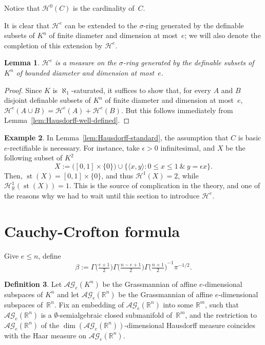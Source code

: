 \documentclass[a4paper, 12pt, final]{article}
\newtheorem{lem}{Lemma}[section]
\newtheorem{open problem}[lem]{Open problem}
\theoremstyle{remark}
\theoremstyle{definition}
\newtheorem{dfn}[lem]{Definition}
\newtheorem{final remark}[lem]{Final remark}
\newtheorem{example}[lem]{Example}
\begin{document}
Notice that ${\mathcal H}^0(C)$ is the cardinality of~$C$.

It is clear that ${\mathcal H}^e$ can be extended to the $\sigma$-ring generated by
the definable subsets of ${K}^n$ of finite diameter and dimension at most~$e$;
we will also denote  the completion of this  extension by ${\mathcal H}^e$.

\begin{lem}
${\mathcal H}^e$ is a measure on the $\sigma$-ring generated by
the definable subsets of ${K}^n$ of bounded diameter and dimension at most~$e$.
\end{lem}

\begin{proof}
Since ${K}$ is $\aleph_1$-saturated, it suffices to show that, for every
$A$ and $B$ disjoint definable subsets of ${K}^n$ of finite diameter and
dimension at most~$e$, ${{\mathcal H}^{e}}(A \cup B) = {{\mathcal H}^{e}}(A) + {{\mathcal H}^{e}}(B)$.
But this follows immediately from Lemma~\ref{lem:Hausdorff-well-defined}.
\end{proof}

\begin{example}\label{ex:double}
In Lemma~\ref{lem:Hausdorff-standard}, the assumption that $C$ is {basic $e$-rectifiable\xspace} is
necessary.
For instance, take $\epsilon > 0$ infinitesimal, and $X$ be the following
subset of ${K}^2$
\[
X := {\bigl( {[0,1] \times {\{0\}}} \bigr)} \cup {\{{{\langle {x,y} \rangle}: 0 \leq x \leq 1 \ \&\  
y = \epsilon x}\}}.
\]
Then, $\operatorname{st}(X) = [0,1] \times {\{0\}}$, and thus
${\mathcal H}^1(X) = 2$, while ${\mathcal H}^1_{\mathbb{R}}(\operatorname{st}(X)) = 1$.
This is the source of complication in the theory, and one of the reasons why
we had to wait until this section to introduce ${{\mathcal H}^{e}}$.
\end{example}

\section{Cauchy-Crofton formula}
Give $e \leq n$, define
\[
\beta := \Gamma{\bigl( {\tfrac{e + 1} 2} \bigr)} \Gamma{\bigl( {\tfrac{n - e + 1} 2} \bigr)}
\Gamma{\bigl( {\tfrac{n + 1} 2} \bigr)}^{-1} \pi^{- 1/2}.
\]

\begin{dfn}
Let ${\mathcal{AG}}_e({K}^n)$ be the Grassmannian of affine $e$-dimensional subspaces
of ${K}^n$ and let  ${\mathcal{AG}}_e({\mathbb{R}}^n)$ be the Grassmannian of affine
$e$-dimensional subspaces of~${\mathbb{R}}^n$.
Fix an embedding of ${\mathcal{AG}}_e({\mathbb{R}}^n)$ into some ${\mathbb{R}}^m$,
such that ${\mathcal{AG}}_e({\mathbb{R}}^n)$ is a {$\emptyset$-semialgebraic\xspace}
closed submanifold of~${\mathbb{R}}^m$, 
and the restriction to ${\mathcal{AG}}_e({\mathbb{R}}^n)$  of the 
$\dim({\mathcal{AG}}_e({\mathbb{R}}^n))$-dimensional Hausdorff measure 
coincides with the Haar measure on ${\mathcal{AG}}_e({\mathbb{R}}^n)$.
\end{dfn}
\end{document}
